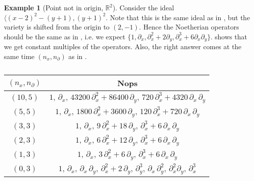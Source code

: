 \documentclass[letterpaper]{article}
\theoremstyle{plain}
\theoremstyle{definition}
\newtheorem{example}[theorem]{Example}
\theoremstyle{remark}
\begin{document}
\begin{example}[Point not in origin, $\mathbb{R}^2$] \label{ex:not_origin_r2}
	Consider the ideal $\langle (x-2)^2 - (y+1), (y+1)^2$. Note that this is the same ideal as in , but the variety is shifted from the origin to $(2,-1)$. Hence the Noetherian operators should be the same as in , i.e. we expect $\{1, \partial_x, \partial_x^2+2 \partial_y, \partial_x^3 + 6 \partial_x \partial_y\}$.  shows that we get constant multiples of the operators. Also, the right answer comes at the same time $(n_x,n_\partial)$ as in .
\begin{table}[h!]
	\centering
	\begin{tabular}{cc}
	\toprule
	$(n_x,n_\partial)$ & Nops\\
	\midrule	
	$(10,5)$ & $1,\,\partial_{x},\,43200\,\partial_{x}^{2}+86400\,\partial_{y},\,720\,\partial_{x}^{3}+4320\,\partial_{x}\,\partial_{y}$\\
	$(5,5)$ & $1,\,\partial_{x},\,1800\,\partial_{x}^{2}+3600\,\partial_{y},\,120\,\partial_{x}^{3}+720\,\partial_{x}\,\partial_{y}$\\
	\midrule
	$(3,3)$ & $1,\,\partial_{x},\,9\,\partial_{x}^{2}+18\,\partial_{y},\,\partial_{x}^{3}+6\,\partial_{x}\,\partial_{y}$ \\
	$(2,3)$ & $1,\,\partial_{x},\,6\,\partial_{x}^{2}+12\,\partial_{y},\,\partial_{x}^{3}+6\,\partial_{x}\,\partial_{y}$\\
	$(1,3)$ & $1,\,\partial_{x},\,3\,\partial_{x}^{2}+6\,\partial_{y},\,\partial_{x}^{3}+6\,\partial_{x}\,\partial_{y}$\\
	$(0,3)$ & $1,\,\partial_{x},\,\partial_{x}\,\partial_{y},\,\partial_{x}^{2}+2\,\partial_{y},\,\partial_{y}^{3},\,\partial_{x}\,\partial_{y}^{2},\,\partial_{x}^{2}\partial_{y},\,\partial_{x}^{3}$\\
	\bottomrule
	\end{tabular}
	\caption{}
	\label{tbl:not_origin_r2}
\end{table}
\end{example}
\end{document}
